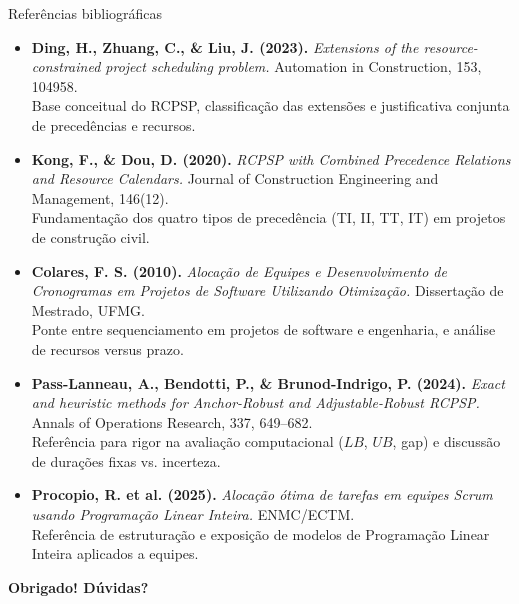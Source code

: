 \documentclass[aspectratio=169]{beamer}
\begin{document}
\begin{frame}{Referências bibliográficas}

\scriptsize
\begin{itemize}
    \setlength{\itemsep}{0.15cm}
    \item \textbf{Ding, H., Zhuang, C., \& Liu, J. (2023).} \emph{Extensions of the resource-constrained project scheduling problem.} Automation in Construction, 153, 104958.
    \\ \textcolor{black!70}{Base conceitual do RCPSP, classificação das extensões e justificativa conjunta de precedências e recursos.}

    \item \textbf{Kong, F., \& Dou, D. (2020).} \emph{RCPSP with Combined Precedence Relations and Resource Calendars.} Journal of Construction Engineering and Management, 146(12).
    \\ \textcolor{black!70}{Fundamentação dos quatro tipos de precedência (TI, II, TT, IT) em projetos de construção civil.}

    \item \textbf{Colares, F. S. (2010).} \emph{Alocação de Equipes e Desenvolvimento de Cronogramas em Projetos de Software Utilizando Otimização.} Dissertação de Mestrado, UFMG.
    \\ \textcolor{black!70}{Ponte entre sequenciamento em projetos de software e engenharia, e análise de recursos versus prazo.}

    \item \textbf{Pass-Lanneau, A., Bendotti, P., \& Brunod-Indrigo, P. (2024).} \emph{Exact and heuristic methods for Anchor-Robust and Adjustable-Robust RCPSP.} Annals of Operations Research, 337, 649--682.
    \\ \textcolor{black!70}{Referência para rigor na avaliação computacional ($LB$, $UB$, gap) e discussão de durações fixas vs. incerteza.}

    \item \textbf{Procopio, R. et al. (2025).} \emph{Alocação ótima de tarefas em equipes Scrum usando Programação Linear Inteira.} ENMC/ECTM.
    \\ \textcolor{black!70}{Referência de estruturação e exposição de modelos de Programação Linear Inteira aplicados a equipes.}
\end{itemize}

\vfill
\begin{center}
    \normalsize\textbf{Obrigado! Dúvidas?}
\end{center}

\end{frame}
\end{document}
